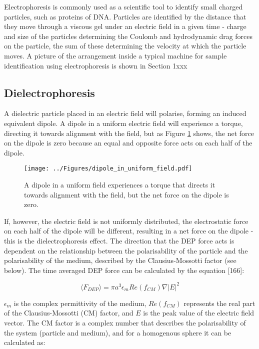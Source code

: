Electrophoresis is commonly used as a scientific tool to identify small charged particles, such as proteins of DNA. Particles are identified by the distance that they move through a viscous gel under an electric field in a given time - charge and size of the particles determining the Coulomb and hydrodynamic drag forces on the particle, the sum of these determining the velocity at which the particle moves. A picture of the arrangement inside a typical machine for sample identification using electrophoresis is shown in Section 1xxx

\subsection{Dielectrophoresis}
\label{sec:bg_dielectrophoresis}
A dielectric particle placed in an electric field will polarise, forming an induced equivalent dipole. A dipole in a uniform electric field will experience a torque, directing it towards alignment with the field, but as Figure \ref{fig:dipole_in_uniform_field} shows, the net force on the dipole is zero because an equal and opposite force acts on each half of the dipole.

\begin{figure}
 \centering
 \texttt{[image: ../Figures/dipole\_in\_uniform\_field.pdf]}
 \caption{A dipole in a uniform field experiences a torque that directs it towards alignment with the field, but the net force on the dipole is zero.}
 \label{fig:dipole_in_uniform_field}
\end{figure}

If, however, the electric field is not uniformly distributed, the electrostatic force on each half of the dipole will be different, resulting in a net force on the dipole - this is the dielectrophoresis effect. The direction that the DEP force acts is dependent on the relationship between the polarisability of the particle and the polarisability of the medium, described by the Clausius-Mossotti factor (see below). The  time averaged DEP force can be calculated by the equation [166]:

\begin{equation}
 \langle F_{DEP} \rangle = \pi a^{3} \epsilon_{m} Re(f_{CM}) \nabla |E|^{2}
\label{eqn:dep_force}
\end{equation}

$\epsilon_{m}$ is the complex permittivity of the medium, $Re(f_{CM})$ represents the real part of the Clausius-Mossotti (CM) factor, and $E$ is the peak value of the electric field vector. The CM factor is a complex number that describes the polarisability of the system (particle and medium), and for a homogenous sphere it can be calculated as:

